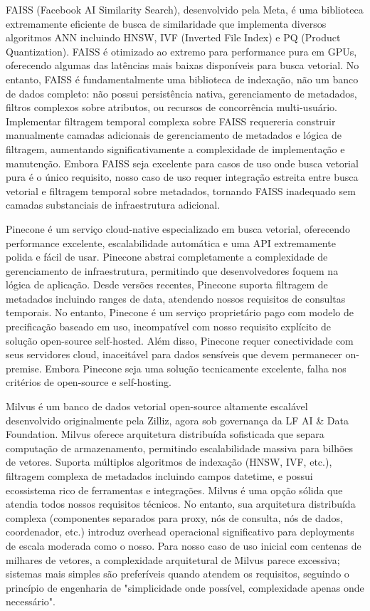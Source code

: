 \documentclass[12pt,a4paper]{article}
\begin{document}
FAISS (Facebook AI Similarity Search), desenvolvido pela Meta, é uma biblioteca extremamente eficiente de busca de similaridade que implementa diversos algoritmos ANN incluindo HNSW, IVF (Inverted File Index) e PQ (Product Quantization). FAISS é otimizado ao extremo para performance pura em GPUs, oferecendo algumas das latências mais baixas disponíveis para busca vetorial. No entanto, FAISS é fundamentalmente uma biblioteca de indexação, não um banco de dados completo: não possui persistência nativa, gerenciamento de metadados, filtros complexos sobre atributos, ou recursos de concorrência multi-usuário. Implementar filtragem temporal complexa sobre FAISS requereria construir manualmente camadas adicionais de gerenciamento de metadados e lógica de filtragem, aumentando significativamente a complexidade de implementação e manutenção. Embora FAISS seja excelente para casos de uso onde busca vetorial pura é o único requisito, nosso caso de uso requer integração estreita entre busca vetorial e filtragem temporal sobre metadados, tornando FAISS inadequado sem camadas substanciais de infraestrutura adicional.

Pinecone é um serviço cloud-native especializado em busca vetorial, oferecendo performance excelente, escalabilidade automática e uma API extremamente polida e fácil de usar. Pinecone abstrai completamente a complexidade de gerenciamento de infraestrutura, permitindo que desenvolvedores foquem na lógica de aplicação. Desde versões recentes, Pinecone suporta filtragem de metadados incluindo ranges de data, atendendo nossos requisitos de consultas temporais. No entanto, Pinecone é um serviço proprietário pago com modelo de precificação baseado em uso, incompatível com nosso requisito explícito de solução open-source self-hosted. Além disso, Pinecone requer conectividade com seus servidores cloud, inaceitável para dados sensíveis que devem permanecer on-premise. Embora Pinecone seja uma solução tecnicamente excelente, falha nos critérios de open-source e self-hosting.

Milvus é um banco de dados vetorial open-source altamente escalável desenvolvido originalmente pela Zilliz, agora sob governança da LF AI & Data Foundation. Milvus oferece arquitetura distribuída sofisticada que separa computação de armazenamento, permitindo escalabilidade massiva para bilhões de vetores. Suporta múltiplos algoritmos de indexação (HNSW, IVF, etc.), filtragem complexa de metadados incluindo campos datetime, e possui ecossistema rico de ferramentas e integrações. Milvus é uma opção sólida que atendia todos nossos requisitos técnicos. No entanto, sua arquitetura distribuída complexa (componentes separados para proxy, nós de consulta, nós de dados, coordenador, etc.) introduz overhead operacional significativo para deployments de escala moderada como o nosso. Para nosso caso de uso inicial com centenas de milhares de vetores, a complexidade arquitetural de Milvus parece excessiva; sistemas mais simples são preferíveis quando atendem os requisitos, seguindo o princípio de engenharia de "simplicidade onde possível, complexidade apenas onde necessário".
\end{document}
